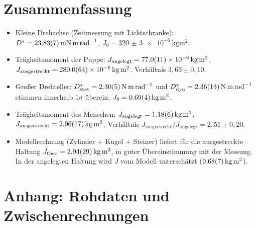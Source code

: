 \documentclass[11pt,a4paper]{article}
\begin{document}
\section{Zusammenfassung}
\begin{itemize}
  \item Kleine Drehachse (Zeitmessung mit Lichtschranke):
        $D^{*} = \SI{23{,}83(7)}{\milli\newton\metre\per\radian}$,
        $J_{0} = \SI{320(3)e-6}{\kilogram\metre\squared}$.
  \item Trägheitsmoment der Puppe:
        $J_{\text{angelegt}} = \SI{77{,}0(11)e-6}{\kilogram\metre\squared}$,
        $J_{\text{ausgestreckt}} = \SI{280{,}0(64)e-6}{\kilogram\metre\squared}$.
        Verhältnis $3{,}63 \pm 0{,}10$.
  \item Großer Drehteller: $D^{*}_{\mathrm{stat}} = \SI{2{,}30(5)}{\newton\metre\per\radian}$
        und $D^{*}_{\mathrm{dyn}} = \SI{2{,}36(13)}{\newton\metre\per\radian}$
        stimmen innerhalb $1\sigma$ überein;
        $J_{0} = \SI{0{,}69(4)}{\kilogram\metre\squared}$.
  \item Trägheitsmoment des Menschen:
        $J_{\text{angelegt}} = \SI{1{,}18(6)}{\kilogram\metre\squared}$,
        $J_{\text{ausgestreckt}} = \SI{2{,}96(17)}{\kilogram\metre\squared}$.
        Verhältnis $J_{\text{ausgestreckt}}/J_{\text{angelegt}} = 2{,}51 \pm 0{,}20$.
  \item Modellrechnung (Zylinder + Kugel + Steiner) liefert für
        die ausgestreckte Haltung
        $J_{\mathrm{theo}}=\SI{2{,}94(29)}{\kilogram\metre\squared}$,
        in guter Übereinstimmung mit der Messung. In der
        angelegten Haltung wird $J$ vom Modell unterschätzt
        ($\SI{0{,}68(7)}{\kilogram\metre\squared}$).
\end{itemize}

\appendix
\section{Anhang: Rohdaten und Zwischenrechnungen}
\end{document}
